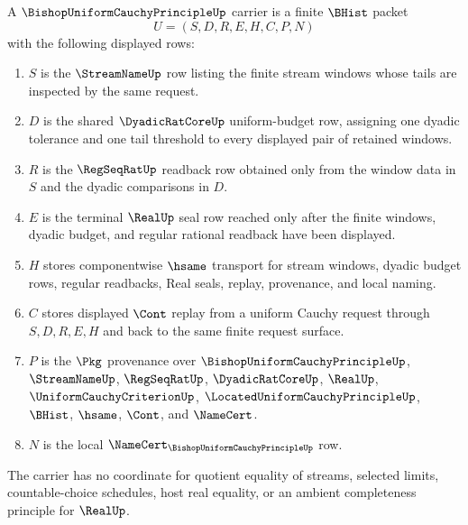 \begin{definition}
\label{def:bishop-uniform-cauchy-principle-carrier}
A $\BishopUniformCauchyPrincipleUp$ carrier is a finite $\BHist$ packet
$$
U=(S,D,R,E,H,C,P,N)
$$
with the following displayed rows:
\begin{enumerate}
\item $S$ is the $\StreamNameUp$ row listing the finite stream windows whose tails are inspected by the same request.
\item $D$ is the shared $\DyadicRatCoreUp$ uniform-budget row, assigning one dyadic tolerance and one tail threshold to every displayed pair of retained windows.
\item $R$ is the $\RegSeqRatUp$ readback row obtained only from the window data in $S$ and the dyadic comparisons in $D$.
\item $E$ is the terminal $\RealUp$ seal row reached only after the finite windows, dyadic budget, and regular rational readback have been displayed.
\item $H$ stores componentwise $\hsame$ transport for stream windows, dyadic budget rows, regular readbacks, Real seals, replay, provenance, and local naming.
\item $C$ stores displayed $\Cont$ replay from a uniform Cauchy request through $S,D,R,E,H$ and back to the same finite request surface.
\item $P$ is the $\Pkg$ provenance over $\BishopUniformCauchyPrincipleUp$, $\StreamNameUp$, $\RegSeqRatUp$, $\DyadicRatCoreUp$, $\RealUp$, $\UniformCauchyCriterionUp$, $\LocatedUniformCauchyPrincipleUp$, $\BHist$, $\hsame$, $\Cont$, and $\NameCert$.
\item $N$ is the local $\NameCert_{\BishopUniformCauchyPrincipleUp}$ row.
\end{enumerate}
The carrier has no coordinate for quotient equality of streams, selected limits, countable-choice schedules, host real equality, or an ambient completeness principle for $\RealUp$.
\end{definition}

